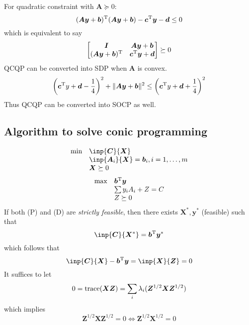 For quadratic constraint with $\bm A\succeq0$:
\[
(\bm{Ay}+\bm b)^{\mathrm T}(\bm{Ay}+\bm b)-\bm c^{\mathrm T}\bm y-\bm d\le0
\]
which is equivalent to say
\[
\begin{bmatrix}
\bm I&\bm{Ay}+\bm b\\
(\bm{Ay}+\bm b)^{\mathrm T}&\bm c^{\mathrm T}\bm y+\bm d
\end{bmatrix}\succeq0
\]
QCQP can be converted into SDP when $\bm A$ is convex.
\[
\left(\bm c^{\mathrm T} y+\bm d-\frac{1}{4}\right)^2+\|\bm A\bm y+\bm b\|^2\le\left(\bm c^{\mathrm T} y+\bm d+\frac{1}{4}\right)^2
\]
Thus QCQP can be converted into SOCP as well.

\subsection{Algorithm to solve conic programming}
\[
\begin{array}{ll}
\min&\inp{\bm C}{\bm X}\\
&\inp{\bm A_i}{\bm X}=\bm b_i,i=1,\dots,m\\
&\bm X\succeq0
\end{array}
\]
\[
\begin{array}{ll}
\max&\bm b^{\mathrm T}\bm y\\
&\sum y_iA_i+Z=C\\
&Z\succeq0
\end{array}
\]
If both (P) and (D) are \emph{strictly feasible}, then there exists $\bm X^*,\bm y^*$ (feasible) such that
\[
\inp{\bm C}{\bm X^*}=\bm b\trans\bm y^*
\]
which follows that
\[
\inp{\bm C}{\bm X}-\bm b\trans\bm y=\inp{\bm X}{\bm Z}=0
\]
It suffices to let
\[
0=\operatorname{trace}(\bm X\bm Z)=\sum_{i}\lambda_i(\bm Z^{1/2}\bm X\bm Z^{1/2})
\]
which implies
\[
\bm Z^{1/2}\bm X\bm Z^{1/2}=0\Longleftrightarrow
\bm Z^{1/2}\bm X^{1/2}=0
\]

















